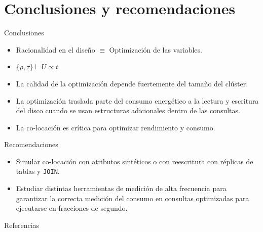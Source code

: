 \documentclass[10pt]{beamer}
\begin{document}
  \section{Conclusiones y recomendaciones} %
  \label{sec:conclusiones_y_recomendaciones}
    \begin{frame}{Conclusiones}
      \begin{itemize}
        \item Racionalidad en el diseño $\equiv$ Optimización de las variables.
        \item $\{\rho, \tau\} \vdash U \propto t$
        \item La calidad de la optimización depende fuertemente del tamaño del
        clúster.
        \item La optimización traslada parte del consumo energético a la lectura
        y escritura del disco cuando se usan estructuras adicionales dentro de
        las consultas.
        \item La co-locación es crítica para optimizar rendimiento y consumo.
      \end{itemize}
    \end{frame}

    \begin{frame}{Recomendaciones}
      \begin{itemize}
        \item Simular co-locación con atributos sintéticos o con reescritura con
        réplicas de tablas y \texttt{JOIN}.
        \item Estudiar distintas herramientas de medición de alta frecuencia
        para garantizar la correcta medición del consumo en consultas
        optimizadas para ejecutarse en fracciones de segundo.
      \end{itemize}
    \end{frame}

  \begin{frame}[allowframebreaks]{Referencias}
    \small
    
    
  \end{frame}
\end{document}
